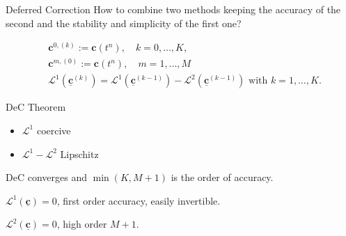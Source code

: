 \documentclass[9pt,compress,t,aspectratio=169]{beamer}
\newcommand{\1}{\begin{pmatrix}
                 1\\
                 1
                \end{pmatrix}}
\def\L{\mathcal{L}}
\def\bbc{\underline{\mathbf{c}}}
\def\bc{\mathbf{c}}
\begin{document}
\begin{frame}{Deferred Correction}
How to combine two methods keeping the accuracy of the second and the stability and simplicity of the first one?

\begin{minipage}{0.58\textwidth}
\begin{equation*}\label{DeC_method}
\begin{split}
&\bc^{0,(k)}:=\bc(t^n), \quad k=0,\dots, K,\\
&\bc^{m,(0)}:=\bc(t^n),\quad m=1,\dots, M\\
&\L^1(\bbc^{(k)})=\L^1(\bbc^{(k-1)})-\L^2(\bbc^{(k-1)})\text{ with }k=1,\dots,K.
\end{split}
\end{equation*}

\begin{block}{DeC Theorem}
	\begin{itemize} \item $\L^1$ coercive \item $\L^1-\L^2$ Lipschitz \end{itemize}
DeC converges and $\min(K,M+1)$ is the order of accuracy.
\end{block}
\end{minipage} \hfill
\begin{minipage}{0.4\textwidth}
	\begin{itemize}
		{
			\item $\mathcal{L}^1(\bbc)=0$, first order accuracy, easily invertible.
			\item $\mathcal{L}^2(\bbc)=0$, high order $M+1$.
		}
	\end{itemize}
\end{minipage}

\end{frame}
\end{document}
